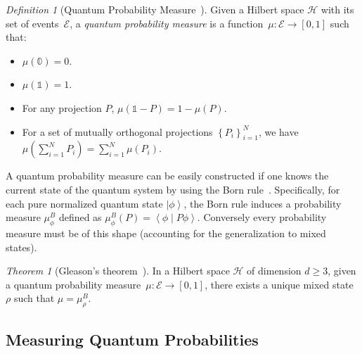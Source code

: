 \documentclass{article}
\theoremstyle{remark}
\newtheorem{definition}{Definition}
\newtheorem{thm}{Theorem}
\newcommand{\Hilb}{\mathcal{H}}
\newcommand{\events}{\ensuremath{\mathcal{E}}}
\newcommand{\ket}[1]{{\left\vert{#1}\right\rangle}}
\newcommand{\ip}[2]{\ensuremath{\left\langle{#1}\middle\vert{#2}\right\rangle}}
\begin{document}
\begin{definition}[Quantum Probability Measure~\cite{10.2307/2308516,gleason1957,Redhead1987-REDINA,Maassen2010}]\label{def:QuantumProbabilitySpace}
Given a Hilbert space $\Hilb$ with its set of events~$\events$,
a \emph{quantum probability measure} is a function~$\mu:\events\rightarrow[0,1]$
such that: 
\begin{itemize}
\item $\mu(\mathbb{0})=0$. 
\item $\mu(\mathbb{1})=1$. 
\item For any projection $P$, $\mu\left(\mathbb{1}-P\right)=1-\mu\left(P\right)$.
\item For a set of mutually orthogonal projections $\left\{ P_{i}\right\} _{i=1}^{N}$,
we have $\mu\left(\sum_{i=1}^{N}P_{i}\right)=\sum_{i=1}^{N}\mu\left(P_{i}\right)$.
\end{itemize}
\end{definition}

\noindent A quantum probability measure can be easily constructed if
one knows the current state of the quantum system by using the Born
rule~\cite{Born1983,Mermin2007,Jaeger2007}.  Specifically, for each
pure normalized quantum state $\ket{\phi}$, the Born rule induces a
probability measure $\mu_{\phi}^{B}$ defined as
$\mu_{\phi}^{B}(P)=\ip{\phi}{P\phi}$. Conversely every probability
measure must be of this shape (accounting for the generalization to
mixed states).

\begin{thm}[Gleason's
  theorem~\cite{gleason1957,Redhead1987-REDINA,peres1995quantum}]\label{cor:Gleason's}In
a Hilbert space $\Hilb$ of dimension $d\geq3$, given a quantum probability
measure~$\mu:\events\rightarrow[0,1]$, there exists a unique mixed
state~$\rho$ such that $\mu=\mu_{\rho}^{B}$.
\end{thm}

\subsection{Measuring Quantum Probabilities}
\end{document}
